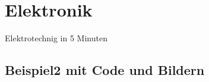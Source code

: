 \chapter{Elektronik}
Elektrotechnig in 5 Minuten
\section{Beispiel2 mit Code und Bildern}
\label{sec:beispiel2}
